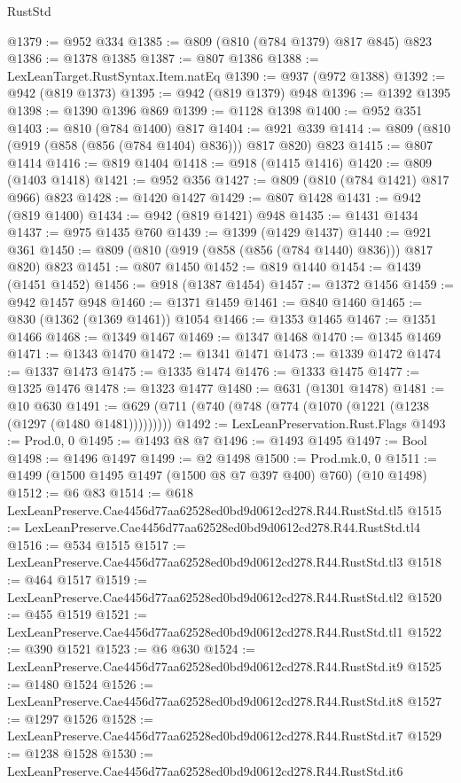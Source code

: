 \begin{lexlean}{RustStd}
\begin{coremodule}
@1379 := @952 @334
@1385 := @809 (@810 (@784 @1379) @817 @845) @823
@1386 := @1378 @1385
@1387 := @807 @1386
@1388 := LexLeanTarget.RustSyntax.Item.natEq
@1390 := @937 (@972 @1388)
@1392 := @942 (@819 @1373)
@1395 := @942 (@819 @1379) @948
@1396 := @1392 @1395
@1398 := @1390 @1396 @869
@1399 := @1128 @1398
@1400 := @952 @351
@1403 := @810 (@784 @1400) @817
@1404 := @921 @339
@1414 := @809 (@810 (@919 (@858 (@856 (@784 @1404) @836))) @817 @820) @823
@1415 := @807 @1414
@1416 := @819 @1404
@1418 := @918 (@1415 @1416)
@1420 := @809 (@1403 @1418)
@1421 := @952 @356
@1427 := @809 (@810 (@784 @1421) @817 @966) @823
@1428 := @1420 @1427
@1429 := @807 @1428
@1431 := @942 (@819 @1400)
@1434 := @942 (@819 @1421) @948
@1435 := @1431 @1434
@1437 := @975 @1435 @760
@1439 := @1399 (@1429 @1437)
@1440 := @921 @361
@1450 := @809 (@810 (@919 (@858 (@856 (@784 @1440) @836))) @817 @820) @823
@1451 := @807 @1450
@1452 := @819 @1440
@1454 := @1439 (@1451 @1452)
@1456 := @918 (@1387 @1454)
@1457 := @1372 @1456
@1459 := @942 @1457 @948
@1460 := @1371 @1459
@1461 := @840 @1460
@1465 := @830 (@1362 (@1369 @1461)) @1054
@1466 := @1353 @1465
@1467 := @1351 @1466
@1468 := @1349 @1467
@1469 := @1347 @1468
@1470 := @1345 @1469
@1471 := @1343 @1470
@1472 := @1341 @1471
@1473 := @1339 @1472
@1474 := @1337 @1473
@1475 := @1335 @1474
@1476 := @1333 @1475
@1477 := @1325 @1476
@1478 := @1323 @1477
@1480 := @631 (@1301 @1478)
@1481 := @10 @630
@1491 := @629 (@711 (@740 (@748 (@774 (@1070 (@1221 (@1238 (@1297 (@1480 @1481)))))))))
@1492 := LexLeanPreservation.Rust.Flags
@1493 := Prod.{0, 0}
@1495 := @1493 @8 @7
@1496 := @1493 @1495
@1497 := Bool
@1498 := @1496 @1497
@1499 := @2 @1498
@1500 := Prod.mk.{0, 0}
@1511 := @1499 (@1500 @1495 @1497 (@1500 @8 @7 @397 @400) @760) (@10 @1498)
@1512 := @6 @83
@1514 := @618 LexLeanPreserve.Cae4456d77aa62528ed0bd9d0612cd278.R44.RustStd.tl5
@1515 := LexLeanPreserve.Cae4456d77aa62528ed0bd9d0612cd278.R44.RustStd.tl4
@1516 := @534 @1515
@1517 := LexLeanPreserve.Cae4456d77aa62528ed0bd9d0612cd278.R44.RustStd.tl3
@1518 := @464 @1517
@1519 := LexLeanPreserve.Cae4456d77aa62528ed0bd9d0612cd278.R44.RustStd.tl2
@1520 := @455 @1519
@1521 := LexLeanPreserve.Cae4456d77aa62528ed0bd9d0612cd278.R44.RustStd.tl1
@1522 := @390 @1521
@1523 := @6 @630
@1524 := LexLeanPreserve.Cae4456d77aa62528ed0bd9d0612cd278.R44.RustStd.it9
@1525 := @1480 @1524
@1526 := LexLeanPreserve.Cae4456d77aa62528ed0bd9d0612cd278.R44.RustStd.it8
@1527 := @1297 @1526
@1528 := LexLeanPreserve.Cae4456d77aa62528ed0bd9d0612cd278.R44.RustStd.it7
@1529 := @1238 @1528
@1530 := LexLeanPreserve.Cae4456d77aa62528ed0bd9d0612cd278.R44.RustStd.it6

\end{coremodule}
\end{lexlean}
